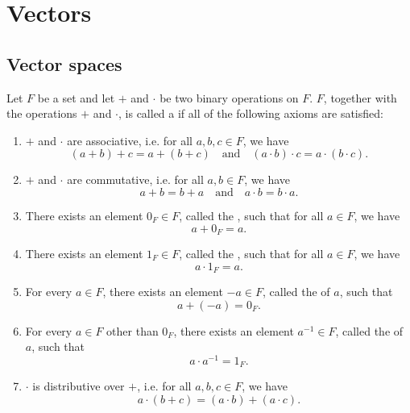 \chapter{Vectors}

\section{Vector spaces}

\begin{defn}
Let $ F $ be a set and let $ + $ and $ \cdot $ be two binary operations on $ F $. $ F $, together with the operations $ + $ and $ \cdot $, is called a  if all of the following axioms are satisfied:
\begin{enumerate}
    \item $ + $ and $ \cdot $ are associative, i.e. for all $ a,b,c\in F $, we have
    \begin{equation*}
        (a+b)+c=a+(b+c) \quad\text{and}\quad (a\cdot b)\cdot c=a\cdot(b\cdot c).
    \end{equation*}

    \item $ + $ and $ \cdot $ are commutative, i.e. for all $ a,b\in F $, we have
    \begin{equation*}
        a+b=b+a \quad\text{and}\quad a\cdot b=b\cdot a.
    \end{equation*}

    \item There exists an element $ 0_F\in F $, called the , such that for all $ a\in F $, we have
    \begin{equation*}
        a+0_F=a.
    \end{equation*}

    \item There exists an element $ 1_F\in F $, called the , such that for all $ a\in F $, we have
    \begin{equation*}
        a\cdot 1_F=a.
    \end{equation*}

    \item For every $ a\in F $, there exists an element $ -a\in F $, called the  of $ a $, such that
    \begin{equation*}
        a+(-a)=0_F.
    \end{equation*}

    \item For every $ a\in F $ other than $ 0_F $, there exists an element $ a^{-1}\in F $, called the  of $ a $, such that
    \begin{equation*}
        a\cdot a^{-1}=1_F.
    \end{equation*}

    \item $ \cdot $ is distributive over $ + $, i.e. for all $ a,b,c\in F $, we have
    \begin{equation*}
        a\cdot(b+c)=(a\cdot b)+(a\cdot c).
    \end{equation*}
\end{enumerate}
\end{defn}


